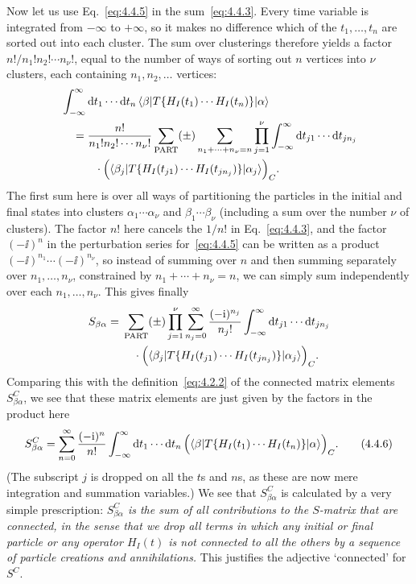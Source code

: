 Now let us use Eq.~\eqref{eq:4.4.5} in the sum~\eqref{eq:4.4.3}. Every time variable is integrated
from $-\infty$ to $+\infty$, so it makes no difference which of the
$t_1,\ldots,t_n$ are sorted out into each cluster. The sum over clusterings
therefore yields a factor $n!/n_1!n_2!\cdots n_\nu!$, equal to the number of
ways of sorting out $n$ vertices into $\nu$ clusters, each containing
$n_1,n_2,\ldots$ vertices:
\begin{align*}
&\int_{-\infty}^{\infty}\mathop{}\!\mathrm{d} t_1\cdots \mathop{}\!\mathrm{d} t_n\,
 \langle \beta\rvert T\{H_I(t_1)\cdots H_I(t_n)\}\lvert \alpha\rangle
\\
&\quad={}
\frac{n!}{n_1!n_2!\cdots n_\nu!}
\sum_{\mathrm{PART}}(\pm)
\sum_{n_1+\cdots+n_\nu=n}
\prod_{j=1}^{\nu}\int_{-\infty}^{\infty}
 \mathop{}\!\mathrm{d} t_{j1}\cdots \mathop{}\!\mathrm{d} t_{jn_j}
\\
&\qquad\quad\cdot
 \Bigl(\langle \beta_j\rvert T\{H_I(t_{j1})\cdots H_I(t_{jn_j})\}
 \lvert \alpha_j\rangle\Bigr)_C.
\end{align*}
The first sum here is over all ways of partitioning the particles in the initial
and final states into clusters $\alpha_1\cdots\alpha_\nu$ and
$\beta_1\cdots\beta_\nu$ (including a sum over the number $\nu$ of clusters).
The factor $n!$ here cancels the $1/n!$ in Eq.~\eqref{eq:4.4.3}, and the factor $(-\ii)^n$
in the perturbation series for~\eqref{eq:4.4.5} can be written as a product
$(-\ii)^{n_1}\cdots(-\ii)^{n_\nu}$, so instead of summing over $n$ and then summing
separately over $n_1,\ldots,n_\nu$, constrained by
$n_1+\cdots+n_\nu=n$, we can simply sum independently over each
$n_1,\ldots,n_\nu$. This gives finally
\begin{align*}
S_{\beta\alpha}
={}&\sum_{\mathrm{PART}}(\pm)\prod_{j=1}^{\nu}
 \sum_{n_j=0}^{\infty}\frac{(-\mathrm{i})^{n_j}}{n_j!}
 \int_{-\infty}^{\infty}\mathop{}\!\mathrm{d} t_{j1}\cdots \mathop{}\!\mathrm{d} t_{jn_j}
\\
&\quad\cdot
 \Bigl(\langle \beta_j\rvert T\{H_I(t_{j1})\cdots H_I(t_{jn_j})\}
 \lvert \alpha_j\rangle\Bigr)_C.
\end{align*}
Comparing this with the definition~\eqref{eq:4.2.2} of the connected matrix elements
$S^C_{\beta\alpha}$, we see that these matrix elements are just given by the
factors in the product here
\begin{equation}
S^C_{\beta\alpha}=\sum_{n=0}^{\infty}\frac{(-\mathrm{i})^n}{n!}
 \int_{-\infty}^{\infty}\mathop{}\!\mathrm{d} t_1\cdots \mathop{}\!\mathrm{d} t_n\,
 \Bigl(\langle \beta\rvert T\{H_I(t_1)\cdots H_I(t_n)\}
 \lvert \alpha\rangle\Bigr)_C.
\tag{4.4.6}
\label{eq:4.4.6}
\end{equation}
(The subscript $j$ is dropped on all the $t$s and $n$s, as these are now mere
integration and summation variables.) We see that $S^C_{\beta\alpha}$ is
calculated by a very simple prescription: \emph{$S^C_{\beta\alpha}$ is the sum
of all contributions to the $S$-matrix that are connected, in the sense that we
drop all terms in which any initial or final particle or any operator $H_I(t)$
is not connected to all the others by a sequence of particle creations and
annihilations.} This justifies the adjective `connected' for $S^C$.

